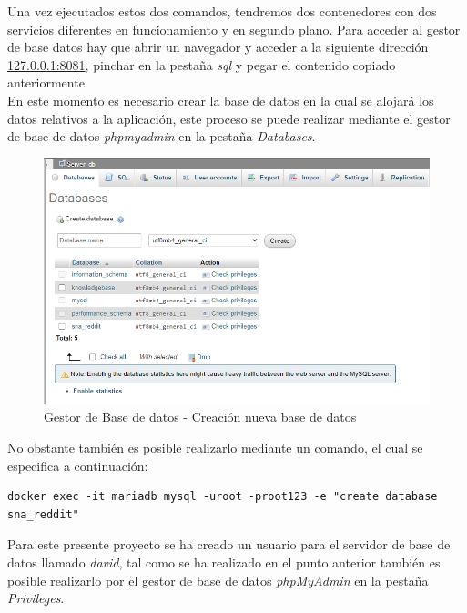 \documentclass[../../main.tex]{subfiles}
\begin{document}
\vskip 0.2in

Una vez ejecutados estos dos comandos, tendremos dos contenedores con dos servicios diferentes en funcionamiento y en segundo plano. Para acceder al gestor de base datos hay que abrir un navegador y acceder a la siguiente dirección \href{127.0.0.1:8081}{127.0.0.1:8081}, pinchar en la pestaña \textit{\gls{sql}} y pegar el contenido copiado anteriormente. \\

En este momento es necesario crear la base de datos en la cual se alojará los datos relativos a la aplicación, este proceso se puede realizar mediante el gestor de base de datos \textit{\gls{phpmyadmin}} en la pestaña \textit{Databases}.

\begin{figure}[H]
\centering
\includegraphics[width=\textwidth]{images/apendices/phpmyadmin-1.png}
\caption{Gestor de Base de datos - Creación nueva base de datos}
\end{figure}

No obstante también es posible realizarlo mediante un comando, el cual se especifica a continuación:

\begin{lstlisting}
docker exec -it mariadb mysql -uroot -proot123 -e "create database sna_reddit"
\end{lstlisting}

\vskip 0.2in

Para este presente proyecto se ha creado un usuario para el servidor de base de datos llamado \textit{david}, tal como se ha realizado en el punto anterior también es posible realizarlo por el gestor de base de datos \textit{phpMyAdmin} en la pestaña \textit{Privileges}. 
\end{document}
